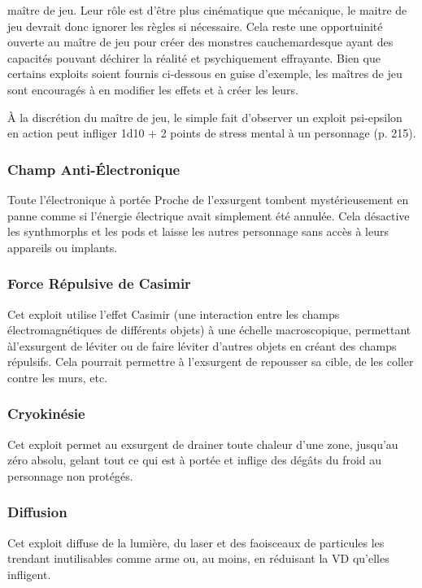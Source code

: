 maître de jeu. Leur rôle est d'être plus cinématique que mécanique, le maitre de jeu devrait donc ignorer les règles si nécessaire. Cela reste une opportuinité ouverte au maître de jeu pour créer des monstres cauchemardesque ayant des capacités pouvant déchirer la réalité et psychiquement effrayante. Bien que certains exploits soient fournis ci-dessous en guise d'exemple, les maîtres de jeu sont encouragés à en modifier les effets et à créer les leurs. 

À la discrétion du maître de jeu, le simple fait d'observer un exploit psi-epsilon en action peut infliger 1d10 + 2 points de stress mental à un personnage (p. 215). 

\subsubsection{Champ Anti-Électronique} 

Toute l'électronique à portée Proche de l'exsurgent tombent mystérieusement en panne comme si l'énergie électrique avait simplement été annulée. Cela désactive les synthmorphs et les pods et laisse les autres personnage sans accès à leurs appareils ou implants. 

\subsubsection{Force Répulsive de Casimir} 

Cet exploit utilise l'effet Casimir (une interaction entre les champs électromagnétiques de différents objets) à une échelle macroscopique, permettant àl'exsurgent de léviter ou de faire léviter d'autres objets en créant des champs répulsifs. Cela pourrait permettre à l'exsurgent de repousser sa cible, de les coller contre les murs, etc. 

\subsubsection{Cryokinésie} 

Cet exploit permet au exsurgent de drainer toute chaleur d'une zone, jusqu'au zéro absolu, gelant tout ce qui est à portée et inflige des dégâts du froid au personnage non protégés. 

\subsubsection{Diffusion} 

Cet exploit diffuse de la lumière, du laser et des faoisceaux de particules les trendant inutilisables comme arme ou, au moins, en réduisant la VD qu'elles infligent. 

